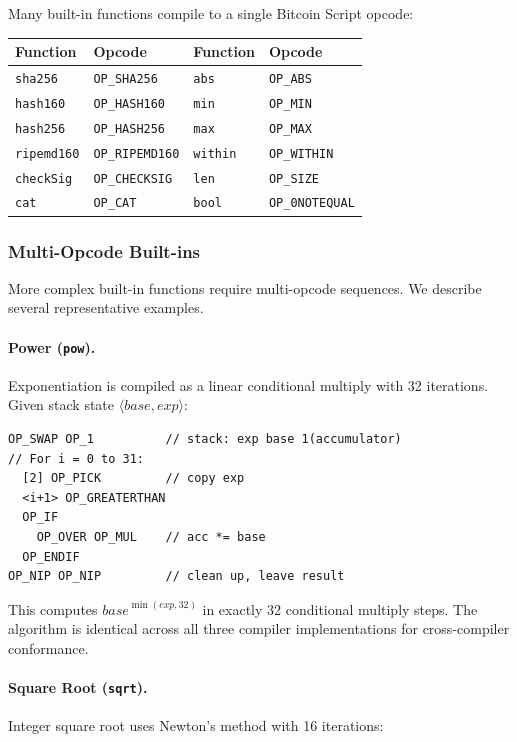 \documentclass[11pt,a4paper]{article}
\newcommand{\op}[1]{\texttt{OP\_#1}}
\begin{document}
Many built-in functions compile to a single Bitcoin Script opcode:

\begin{center}
\small
\begin{tabular}{@{}ll@{\qquad}ll@{}}
\toprule
\textbf{Function} & \textbf{Opcode} & \textbf{Function} & \textbf{Opcode} \\
\midrule
\texttt{sha256} & \op{SHA256} & \texttt{abs} & \op{ABS} \\
\texttt{hash160} & \op{HASH160} & \texttt{min} & \op{MIN} \\
\texttt{hash256} & \op{HASH256} & \texttt{max} & \op{MAX} \\
\texttt{ripemd160} & \op{RIPEMD160} & \texttt{within} & \op{WITHIN} \\
\texttt{checkSig} & \op{CHECKSIG} & \texttt{len} & \op{SIZE} \\
\texttt{cat} & \op{CAT} & \texttt{bool} & \op{0NOTEQUAL} \\
\bottomrule
\end{tabular}
\end{center}

\subsubsection{Multi-Opcode Built-ins}

More complex built-in functions require multi-opcode sequences.
We describe several representative examples.

\paragraph{Power (\texttt{pow}).}
Exponentiation is compiled as a linear conditional multiply with 32
iterations. Given stack state $\langle \textit{base}, \textit{exp} \rangle$:

\begin{lstlisting}[style=script]
OP_SWAP OP_1          // stack: exp base 1(accumulator)
// For i = 0 to 31:
  [2] OP_PICK         // copy exp
  <i+1> OP_GREATERTHAN
  OP_IF
    OP_OVER OP_MUL    // acc *= base
  OP_ENDIF
OP_NIP OP_NIP         // clean up, leave result
\end{lstlisting}

This computes $\textit{base}^{\min(\textit{exp}, 32)}$ in exactly 32
conditional multiply steps. The algorithm is identical across all three
compiler implementations for cross-compiler conformance.

\paragraph{Square Root (\texttt{sqrt}).}
Integer square root uses Newton's method with 16 iterations:
\end{document}
